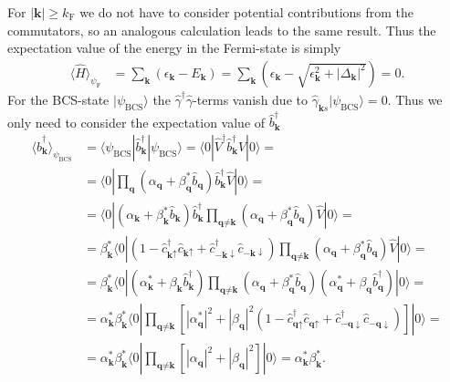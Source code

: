 \documentclass[english, parskip=full]{scrartcl}
\renewcommand{\bra}{}
\renewcommand{\braket}{}
\newcommand{\kla}{}
\newcommand{\klam}{}
\newcommand{\tecxt}{}
\newcommand{\Ket}{}
\begin{document}
For $|\textbf{k}| \ge k_\tecxt\text{F}$ we do not have to consider potential contributions from the commutators, so an analogous calculation leads to the same result.
Thus the expectation value of the energy in the Fermi-state is simply
\begin{align}
\bra\langle \hat{H} \rangle_{\psi_\tecxt\text{F}} &= \sum_\textbf{k} \kla\left( \epsilon_\textbf{k} - E_\textbf{k} \right) = \sum_\textbf{k} \kla\left( \epsilon_\textbf{k} - \sqrt{\epsilon_\textbf{k}^2 + |\Delta_\textbf{k}|^2} \right) = 0.
\end{align}
For the BCS-state $\Ket | \psi_\tecxt\text{BCS} \rangle$ the $\hat{\gamma}^\dagger\hat{\gamma}$-terms vanish due to $\hat{\gamma}_{\textbf{k}s} \Ket | \psi_\tecxt\text{BCS} \rangle = 0$.
Thus we only need to consider the expectation value of $\hat{b}_\textbf{k}^\dagger$
\begin{align}
\bra\langle \hat{b}_\textbf{k}^\dagger \rangle_{\psi_\tecxt\text{BCS}} &= \braket\langle \psi_\tecxt\text{BCS} | \hat{b}_\textbf{k}^\dagger | \psi_\tecxt\text{BCS} \rangle = \braket\langle 0 | \hat{V}^\dagger \hat{b}_\textbf{k}^\dagger \hat{V} | 0 \rangle = \\
&= \braket\langle 0 | \prod_\textbf{q} \left( \alpha_\textbf{q} + \beta_\textbf{q}^\ast \hat{b}_\textbf{q} \right) \hat{b}_\textbf{k}^\dagger \hat{V} | 0 \rangle = \\
&= \braket\langle 0 | \left( \alpha_\textbf{k} + \beta_\textbf{k}^\ast \hat{b}_\textbf{k} \right) \hat{b}_\textbf{k}^\dagger  \prod_{\textbf{q} \neq \textbf{k}} \left( \alpha_\textbf{q} + \beta_\textbf{q}^\ast \hat{b}_\textbf{q} \right) \hat{V}  | 0 \rangle = \\
&= \beta^\ast_\textbf{k}\braket\langle 0 | \kla\left( 1 - \hat{c}_{\textbf{k}\uparrow}^\dagger \hat{c}_{\textbf{k}\uparrow} +  \hat{c}_{-\textbf{k}\downarrow}^\dagger \hat{c}_{-\textbf{k}\downarrow} \right)  \prod_{\textbf{q} \neq \textbf{k}} \left( \alpha_\textbf{q} + \beta_\textbf{q}^\ast \hat{b}_\textbf{q} \right) \hat{V} | 0 \rangle  = \\
&= \beta_\textbf{k}^\ast \braket\langle 0 | \left( \alpha_\textbf{k}^\ast + \beta_\textbf{k} \hat{b}_\textbf{k}^\dagger \right) \prod_{\textbf{q} \neq \textbf{k}} \left( \alpha_\textbf{q} + \beta_\textbf{q}^\ast \hat{b}_\textbf{q} \right) \left( \alpha_\textbf{q}^\ast + \beta_\textbf{q} \hat{b}_\textbf{q}^\dagger \right) | 0 \rangle = \\
&= \alpha_\textbf{k}^\ast \beta_\textbf{k}^\ast \braket\langle 0 | \prod_{\textbf{q} \neq \textbf{k}} \klam\left[ |\alpha_\textbf{q}^\ast|^2 + |\beta_\textbf{q}|^2 \kla\left( 1 - \hat{c}_{\textbf{q}\uparrow}^\dagger \hat{c}_{\textbf{q}\uparrow} +  \hat{c}_{-\textbf{q}\downarrow}^\dagger \hat{c}_{-\textbf{q}\downarrow} \right) \right] | 0 \rangle = \\
&= \alpha_\textbf{k}^\ast \beta_\textbf{k}^\ast \braket\langle 0 | \prod_{\textbf{q} \neq \textbf{k}} \klam\left[ |\alpha_\textbf{q}|^2 + |\beta_\textbf{q}|^2 \right] | 0 \rangle = \alpha_\textbf{k}^\ast \beta_\textbf{k}^\ast.
\end{align}
\end{document}

